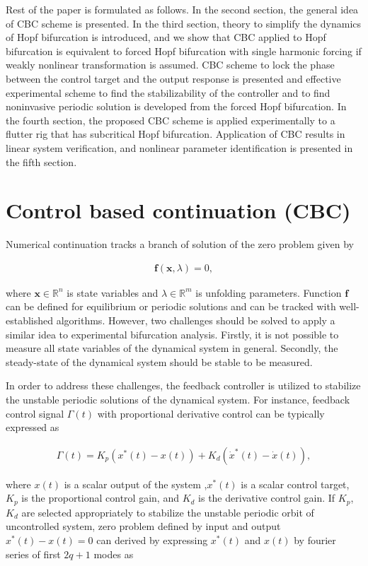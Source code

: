 \documentclass[openacc]{rsproca_new}%
\def\real{\mathbb{R}}
\def\vec#1{\ensuremath{\mathbf{#1}}}
\begin{document}
Rest of the paper is formulated as follows. In the second section, the general idea of CBC scheme is presented. In the third section, theory to simplify the dynamics of Hopf bifurcation is introduced, and we show that CBC applied to Hopf bifurcation is equivalent to forced Hopf bifurcation with single harmonic forcing if weakly nonlinear transformation is assumed. CBC scheme to lock the phase between the control target and the output response is presented and effective experimental scheme to find the stabilizability of the controller and to find noninvasive periodic solution is developed from the forced Hopf bifurcation. In the fourth section, the proposed CBC scheme is applied experimentally to a flutter rig that has subcritical Hopf bifurcation. Application of CBC results in linear system verification, and nonlinear parameter identification is presented in the fifth section.


\section{Control based continuation (CBC)}\label{CBC}

Numerical continuation tracks a branch of solution of the zero problem given by

\begin{align} \label{eq:nc}
  \vec{f}(\vec{x},\lambda)=0,
\end{align}

\noindent where $\vec{x}\in \real ^n$ is state variables and $\lambda \in \real ^m$ is unfolding parameters. Function $\vec f$ can be defined for equilibrium or periodic solutions and can be tracked with well-established algorithms. However, two challenges should be solved to apply a similar idea to experimental bifurcation analysis. Firstly, it is not possible to measure all state variables of the dynamical system in general. Secondly, the steady-state of the dynamical system should be stable to be measured.

In order to address these challenges, the feedback controller is utilized to stabilize the unstable periodic solutions of the dynamical system.
For instance, feedback control signal $\Gamma(t)$ with proportional derivative control can be typically expressed as

\begin{align}
  \Gamma(t)=K_p(x^*(t)-x(t))+K_d(\dot x^*(t)-\dot x(t)),
\end{align}

\noindent where $x(t)$ is a scalar output of the system ,$x^*(t)$ is a scalar control target, $K_p$ is the proportional control gain, and $K_d$ is the derivative control gain. If $K_p$,$K_d$ are selected appropriately to stabilize the unstable periodic orbit of uncontrolled system, zero problem defined by input and output $x^*(t)-x(t)=0$ can derived by expressing $x^*(t)$ and $x(t)$ by fourier series of first $2q+1$ modes as
\end{document}
